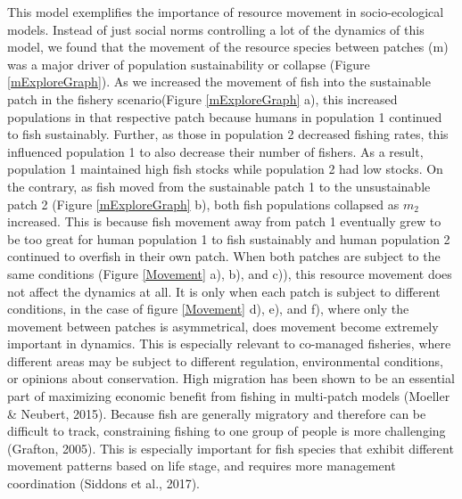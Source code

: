 \documentclass[
  12pt,
]{article}
\begin{document}
This model exemplifies the importance of resource movement in socio-ecological models. Instead of just social norms controlling a lot of the dynamics of this model, we found that the movement of the resource species between patches (m) was a major driver of population sustainability or collapse (Figure \ref{mExploreGraph}). As we increased the movement of fish into the sustainable patch in the fishery scenario(Figure \ref{mExploreGraph} a), this increased populations in that respective patch because humans in population 1 continued to fish sustainably. Further, as those in population 2 decreased fishing rates, this influenced population 1 to also decrease their number of fishers. As a result, population 1 maintained high fish stocks while population 2 had low stocks. On the contrary, as fish moved from the sustainable patch 1 to the unsustainable patch 2 (Figure \ref{mExploreGraph} b), both fish populations collapsed as \(m_2\) increased. This is because fish movement away from patch 1 eventually grew to be too great for human population 1 to fish sustainably and human population 2 continued to overfish in their own patch. When both patches are subject to the same conditions (Figure \ref{Movement} a), b), and c)), this resource movement does not affect the dynamics at all. It is only when each patch is subject to different conditions, in the case of figure \ref{Movement} d), e), and f), where only the movement between patches is asymmetrical, does movement become extremely important in dynamics. This is especially relevant to co-managed fisheries, where different areas may be subject to different regulation, environmental conditions, or opinions about conservation. High migration has been shown to be an essential part of maximizing economic benefit from fishing in multi-patch models (Moeller \& Neubert, 2015). Because fish are generally migratory and therefore can be difficult to track, constraining fishing to one group of people is more challenging (Grafton, 2005). This is especially important for fish species that exhibit different movement patterns based on life stage, and requires more management coordination (Siddons et al., 2017).
\end{document}
